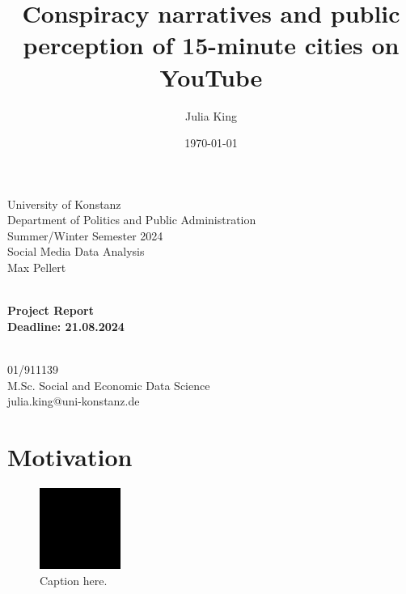 \documentclass[fontsize=11pt, parskip=half]{scrartcl}
\title{Conspiracy narratives and public perception of 15-minute cities on YouTube}\let\Title\@title
\author{Julia King}          \let\Author\@author
\date{\today}           \let\Date\@date
\makeatletter
\def \papersubtitle {Project Report}
\def \paperdeadline {21.08.2024}
\def \paperevaluator {Max Pellert}
\def \paperseminar {Social Media Data Analysis}
\def \papersemester {Summer/Winter Semester 2024}
\def \paperdepartment {Department of Politics and Public Administration}
\def \paperuniversity {University of Konstanz}
\def \paperemail {julia.king@uni-konstanz.de}
\def \paperprogramme {M.Sc. Social and Economic Data Science}
\def \papermatriculationnr {01/911139}
\makeatother
\begin{document}
\setlength{\columnsep}{25pt}

\begin{titlepage}
    \newcommand{\HRule}{\rule{\linewidth}{0.5mm}}
    
    \begin{flushleft} %
        \large
        \paperuniversity\\
        \paperdepartment\\
        \papersemester\\
        \paperseminar\\
        \paperevaluator
    \end{flushleft}
    
    \vfill
    
    \begin{center} %
        \huge\bfseries \Title\\
        \vspace{0.5cm}
        \large \papersubtitle \\
        \vspace{0.5cm}
        \small Deadline: \paperdeadline
    \end{center}
    
    \vfill
    
    \begin{flushright} %
        \large
        \Author\\
        \papermatriculationnr\\
        \paperprogramme\\
        \paperemail
    \end{flushright}
\end{titlepage}

\clearpage
\setcounter{page}{1}

\section{Motivation}
\label{section:motivation}
    \parencite[12]{gloverConspiracyThinking15Minute2024}
    
    \begin{figure}
        \setlength\intextsep{0pt}
        \vspace{-30pt}
        \caption{} %
        \includegraphics[width=0.38 \textwidth]{img/ex.png}
        \vspace{-5pt}
        \caption*{Caption here.}
        \vspace{-20pt}
        \label{fig:attitude-distribution}
    \end{figure}
    
\end{document}
